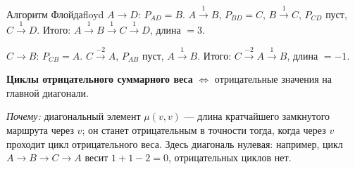\begin{algo}{Алгоритм Флойда}{floyd}
$A \to D$: $P_{AD} = B$. $A \xrightarrow{1} B$, $P_{BD} = C$, $B \xrightarrow{1} C$, $P_{CD}$ пуст, $C \xrightarrow{1} D$. Итого: $A \xrightarrow{1} B \xrightarrow{1} C \xrightarrow{1} D$, длина $= 3$.

$C \to B$: $P_{CB} = A$. $C \xrightarrow{-2} A$, $P_{AB}$ пуст, $A \xrightarrow{1} B$. Итого: $C \xrightarrow{-2} A \xrightarrow{1} B$, длина $= -1$.

\medskip
\textbf{Циклы отрицательного суммарного веса} $\Leftrightarrow$ отрицательные значения на главной диагонали.

\textit{Почему:} диагональный элемент $\mu(v, v)$ --- длина кратчайшего
замкнутого маршрута через $v$; он станет отрицательным в точности тогда,
когда через $v$ проходит цикл отрицательного веса. Здесь диагональ
нулевая: например, цикл $A \to B \to C \to A$ весит $1 + 1 - 2 = 0$,
отрицательных циклов нет.

\end{algo}


